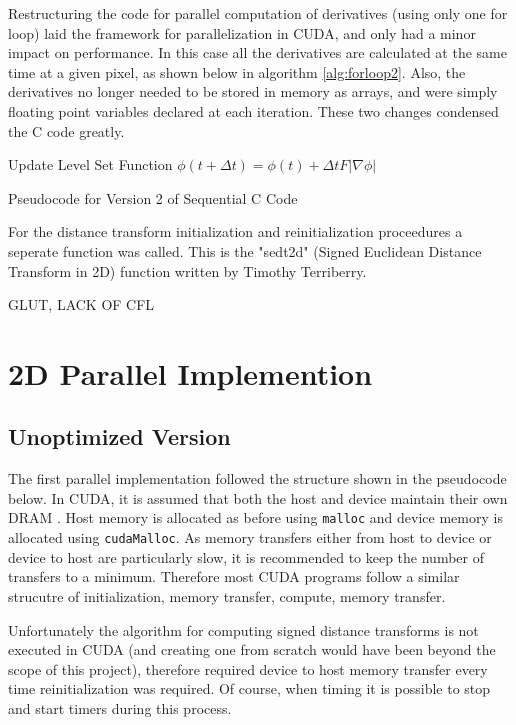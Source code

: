 Restructuring the code for parallel computation of derivatives (using only one for loop) laid the framework for parallelization in CUDA, and only had a minor impact on performance. In this case all the derivatives are calculated at the same time at a given pixel, as shown below in algorithm \ref{alg:forloop2}. Also, the derivatives no longer needed to be stored in memory as arrays, and were simply floating point variables declared at each iteration. These two changes condensed the C code greatly.


\begin{algorithm}[h]
\dontprintsemicolon
{}
\BlankLine
Update Level Set Function $\phi(t+\Delta t) =\phi(t) + \Delta t F|\nabla\phi|$\;
\caption{Pseudocode for Version 2 of Sequential C Code}\label{alg:forloop2}
\end{algorithm}

For the distance transform initialization and reinitialization proceedures a seperate function was called. This is the "sedt2d" (Signed Euclidean Distance Transform in 2D) function written by Timothy Terriberry.

GLUT, LACK OF CFL

\section{2D Parallel Implemention}
	\subsection{Unoptimized Version}
The first parallel implementation followed the structure shown in the pseudocode below. In CUDA, it is assumed that both the host and device maintain their own DRAM \cite{cuda}. Host memory is allocated as before using \texttt{malloc} and device memory is allocated using \texttt{cudaMalloc}. As memory transfers either from host to device or device to host are particularly slow, it is recommended to keep the number of transfers to a minimum. Therefore most CUDA programs follow a similar strucutre of initialization, memory transfer, compute, memory transfer. 

Unfortunately the algorithm for computing signed distance transforms is not executed in CUDA (and creating one from scratch would have been beyond the scope of this project), therefore required device to host memory transfer every time reinitialization was required. Of course, when timing it is possible to stop and start timers during this process.

